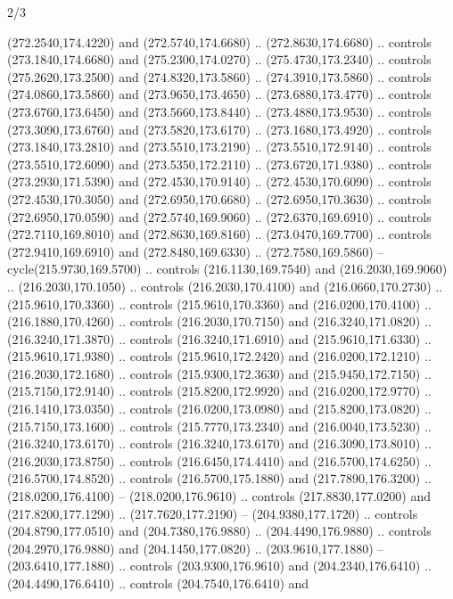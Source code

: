 \begin{flagdescription}{2/3}
\begin{scope}[xshift=0.5\flaglength,yshift=0.5\flagwidth,scale=\flagwidth/259.2]
\begin{scope}[y=0.8pt, x=0.8pt, yscale=-1,shift={(-243,-162)}]
      (272.2540,174.4220) and (272.5740,174.6680) .. (272.8630,174.6680) .. controls
      (273.1840,174.6680) and (275.2300,174.0270) .. (275.4730,173.2340) .. controls
      (275.2620,173.2500) and (274.8320,173.5860) .. (274.3910,173.5860) .. controls
      (274.0860,173.5860) and (273.9650,173.4650) .. (273.6880,173.4770) .. controls
      (273.6760,173.6450) and (273.5660,173.8440) .. (273.4880,173.9530) .. controls
      (273.3090,173.6760) and (273.5820,173.6170) .. (273.1680,173.4920) .. controls
      (273.1840,173.2810) and (273.5510,173.2190) .. (273.5510,172.9140) .. controls
      (273.5510,172.6090) and (273.5350,172.2110) .. (273.6720,171.9380) .. controls
      (273.2930,171.5390) and (272.4530,170.9140) .. (272.4530,170.6090) .. controls
      (272.4530,170.3050) and (272.6950,170.6680) .. (272.6950,170.3630) .. controls
      (272.6950,170.0590) and (272.5740,169.9060) .. (272.6370,169.6910) .. controls
      (272.7110,169.8010) and (272.8630,169.8160) .. (273.0470,169.7700) .. controls
      (272.9410,169.6910) and (272.8480,169.6330) .. (272.7580,169.5860) --
      cycle(215.9730,169.5700) .. controls (216.1130,169.7540) and
      (216.2030,169.9060) .. (216.2030,170.1050) .. controls (216.2030,170.4100) and
      (216.0660,170.2730) .. (215.9610,170.3360) .. controls (215.9610,170.3360) and
      (216.0200,170.4100) .. (216.1880,170.4260) .. controls (216.2030,170.7150) and
      (216.3240,171.0820) .. (216.3240,171.3870) .. controls (216.3240,171.6910) and
      (215.9610,171.6330) .. (215.9610,171.9380) .. controls (215.9610,172.2420) and
      (216.0200,172.1210) .. (216.2030,172.1680) .. controls (215.9300,172.3630) and
      (215.9450,172.7150) .. (215.7150,172.9140) .. controls (215.8200,172.9920) and
      (216.0200,172.9770) .. (216.1410,173.0350) .. controls (216.0200,173.0980) and
      (215.8200,173.0820) .. (215.7150,173.1600) .. controls (215.7770,173.2340) and
      (216.0040,173.5230) .. (216.3240,173.6170) .. controls (216.3240,173.6170) and
      (216.3090,173.8010) .. (216.2030,173.8750) .. controls (216.6450,174.4410) and
      (216.5700,174.6250) .. (216.5700,174.8520) .. controls (216.5700,175.1880) and
      (217.7890,176.3200) .. (218.0200,176.4100) -- (218.0200,176.9610) .. controls
      (217.8830,177.0200) and (217.8200,177.1290) .. (217.7620,177.2190) --
      (204.9380,177.1720) .. controls (204.8790,177.0510) and (204.7380,176.9880) ..
      (204.4490,176.9880) .. controls (204.2970,176.9880) and (204.1450,177.0820) ..
      (203.9610,177.1880) -- (203.6410,177.1880) .. controls (203.9300,176.9610) and
      (204.2340,176.6410) .. (204.4490,176.6410) .. controls (204.7540,176.6410) and

\end{scope}
\end{scope}
\end{flagdescription}
